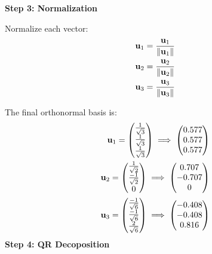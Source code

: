 \documentclass[11pt]{book}
\begin{document}
\begin{enumerate}
\textbf{Step 3: Normalization}

Normalize each vector:
\begin{align}
\mathbf{u}_1 = \frac{\mathbf{u}_1}{\left\lVert\mathbf{u}_1\right\rVert} \\
\mathbf{u}_2 = \frac{\mathbf{u}_2}{\left\lVert\mathbf{u}_2\right\rVert} \\
\mathbf{u}_3 = \frac{\mathbf{u}_3}{\left\lVert\mathbf{u}_3\right\rVert} 
\end{align}

The final orthonormal basis is:
\begin{align*}
\mathbf{u}_1 = \begin{pmatrix}\frac{1}{\sqrt{3}}\\ \frac{1}{\sqrt{3}}\\ \frac{1}{\sqrt{3}}\end{pmatrix} 
\implies\begin{pmatrix}0.577\\0.577\\0.577\end{pmatrix}\\
\mathbf{u}_2 = \begin{pmatrix}\frac{1}{\sqrt{2}}\\\frac{-1}{\sqrt{2}}\\0 \end{pmatrix}
\implies \begin{pmatrix}0.707 \\ -0.707 \\ 0\end{pmatrix}\\
\mathbf{u}_3 = \begin{pmatrix}\frac{-1}{\sqrt{6}}\\ \frac{-1}{\sqrt{6}}\\ \frac{2}{\sqrt{6}}\end{pmatrix} 
\implies \begin{pmatrix}-0.408\\-0.408\\0.816\end{pmatrix}
\end{align*}
\textbf{Step 4: QR Decoposition}


\end{enumerate}
\end{document}
